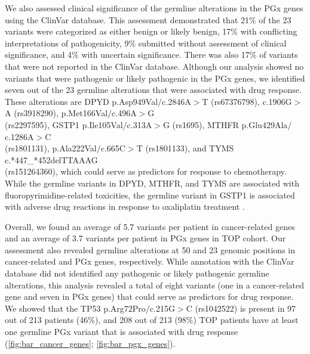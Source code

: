 We also assessed clinical significance of the germline alterations in the PGx genes using the ClinVar database. This assessment demonstrated that 21\% of the 23 variants were categorized as either benign or likely benign, 17\% with conflicting interpretations of pathogenicity, 9\% submitted without assessment of clinical significance, and 4\% with uncertain significance. There was also 17\% of variants that were not reported in the ClinVar database. Although our analysis showed no variants that were pathogenic or likely pathogenic in the PGx genes, we identified seven out of the 23 germline alterations that were associated with drug response. These alterations are \acs{DPYD} p.Asp949Val$/$c.2846A$>$T (rs67376798), c.1906G$>$A (rs3918290), p.Met166Val$/$c.496A$>$G \\(rs2297595), \acs{GSTP1} p.Ile105Val$/$c.313A$>$G (rs1695), \acs{MTHFR} p.Glu429Ala$/$c.1286A$>$C \\(rs1801131), p.Ala222Val$/$c.665C$>$T (rs1801133), and \acs{TYMS} c.*447\_*452delTTAAAG \\(rs151264360), which could serve as predictors for response to chemotherapy. While the germline variants in \acs{DPYD}, \acs{MTHFR}, and \acs{TYMS} are associated with fluoropyrimidine-related toxicities, the germline variant in \acs{GSTP1} is associated with adverse drug reactions in response to oxaliplatin treatment \cite{Panczyk2014, Mohelnikova-Duchonova2014}.

Overall, we found an average of 5.7 variants per patient in cancer-related genes and an average of 3.7 variants per patient in PGx genes in TOP cohort. Our assessment also revealed germline alterations at 50 and 23 genomic positions in cancer-related and PGx genes, respectively. While annotation with the ClinVar database did not identified any pathogenic or likely pathogenic germline alterations, this analysis revealed a total of eight variants (one in a cancer-related gene and seven in PGx genes) that could serve as predictors for drug response. We showed that the \acs{TP53} p.Arg72Pro$/$c.215G$>$C (rs1042522) is present in 97 out of 213 patients (46\%), and 208 out of 213 (98\%) TOP patients have at least one germline PGx variant that is associated with drug response (\autoref{fig:bar_cancer_genes}; \autoref{fig:bar_pgx_genes}).



